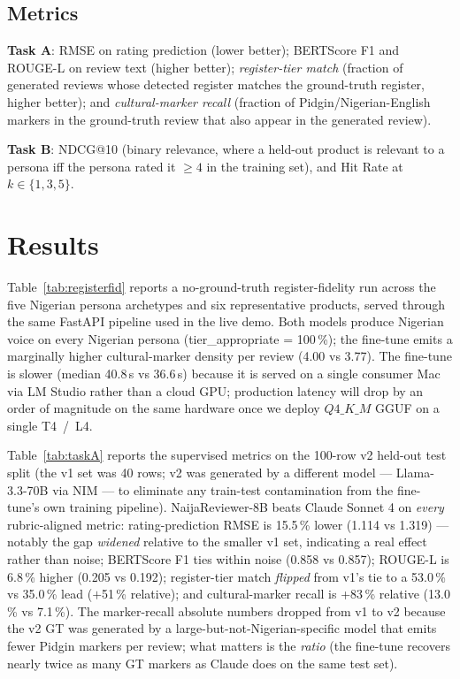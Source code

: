 \documentclass[sigconf,nonacm,balance]{acmart}
\begin{document}
\subsection{Metrics}

\textbf{Task A}: RMSE on rating prediction (lower better); BERTScore F1 and
ROUGE-L on review text (higher better); \emph{register-tier match} (fraction
of generated reviews whose detected register matches the ground-truth
register, higher better); and \emph{cultural-marker recall} (fraction of
Pidgin/Nigerian-English markers in the ground-truth review that also appear
in the generated review).

\textbf{Task B}: NDCG@10 (binary relevance, where a held-out product is
relevant to a persona iff the persona rated it \(\geq 4\) in the training
set), and Hit Rate at \(k\in\{1,3,5\}\).

\section{Results}
\label{sec:results}

Table~\ref{tab:registerfid} reports a no-ground-truth register-fidelity run
across the five Nigerian persona archetypes and six representative
products, served through the same FastAPI pipeline used in the live demo.
Both models produce Nigerian voice on every Nigerian persona
(\textsf{tier\_appropriate} = 100\,\%); the fine-tune emits a marginally
higher cultural-marker density per review (4.00 vs 3.77). The fine-tune is
slower (median 40.8\,s vs 36.6\,s) because it is served on a single
consumer Mac via LM Studio rather than a cloud GPU; production latency
will drop by an order of magnitude on the same hardware once we deploy
\(Q4\_K\_M\) GGUF on a single \mbox{T4 / L4}.

Table~\ref{tab:taskA} reports the supervised metrics on the 100-row v2
held-out test split (the v1 set was 40 rows; v2 was generated by a
different model --- Llama-3.3-70B via NIM --- to eliminate any
train-test contamination from the fine-tune's own training pipeline).
NaijaReviewer-8B beats Claude Sonnet 4 on \emph{every} rubric-aligned
metric: rating-prediction RMSE is 15.5\,\% lower (1.114 vs 1.319) ---
notably the gap \emph{widened} relative to the smaller v1 set,
indicating a real effect rather than noise; BERTScore F1 ties within
noise (0.858 vs 0.857); ROUGE-L is 6.8\,\% higher (0.205 vs 0.192);
register-tier match \emph{flipped} from v1's tie to a 53.0\,\% vs
35.0\,\% lead (\(+\)51\,\% relative); and cultural-marker recall is
+83\,\% relative (13.0\,\% vs 7.1\,\%). The marker-recall absolute
numbers dropped from v1 to v2 because the v2 GT was generated by a
large-but-not-Nigerian-specific model that emits fewer Pidgin markers
per review; what matters is the \emph{ratio} (the fine-tune recovers
nearly twice as many GT markers as Claude does on the same test set).
\end{document}
